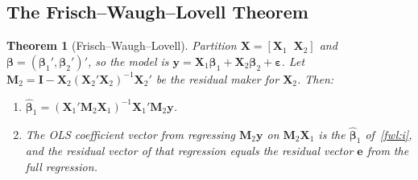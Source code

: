 \documentclass[14pt]{extarticle}
\theoremstyle{plain}
\newtheorem{theorem}{Theorem}[section]
\theoremstyle{definition}
\theoremstyle{remark}
\newcommand{\bX}{\mathbf{X}}
\newcommand{\by}{\mathbf{y}}
\def\bb{\boldsymbol{\beta}}
\newcommand{\be}{\boldsymbol{\varepsilon}}
\newcommand{\bI}{\mathbf{I}}
\newcommand{\bM}{\mathbf{M}}
\begin{document}
\subsection{The Frisch--Waugh--Lovell Theorem}

\begin{theorem}[Frisch--Waugh--Lovell]\label{thm:fwl}
Partition $\bX = [\bX_1 \;\; \bX_2]$ and $\bb = (\bb_1', \bb_2')'$, so the model is $\by = \bX_1\bb_1 + \bX_2\bb_2 + \be$. Let $\bM_2 = \bI - \bX_2(\bX_2'\bX_2)^{-1}\bX_2'$ be the residual maker for $\bX_2$. Then:
\begin{enumerate}[label=\textup{(\roman*)}]
\item\label{fwl:i} $\hat{\bb}_1 = (\bX_1'\bM_2\bX_1)^{-1}\bX_1'\bM_2\by$.
\item The OLS coefficient vector from regressing $\bM_2\by$ on $\bM_2\bX_1$ is the $\hat{\bb}_1$ of~\ref{fwl:i}, and the residual vector of that regression equals the residual vector $\mathbf{e}$ from the full regression.
\end{enumerate}
\end{theorem}
\end{document}
